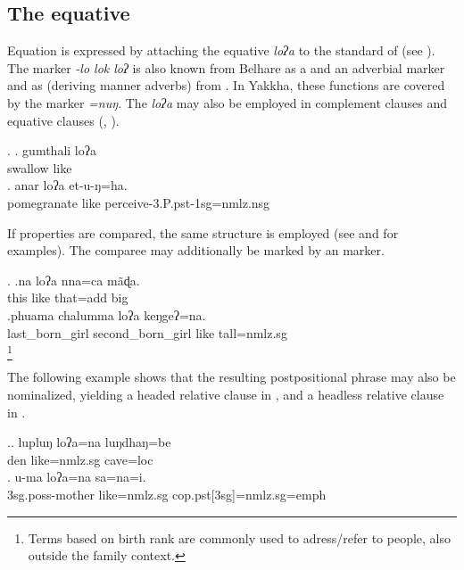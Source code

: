 \subsection{The equative}\label{sec-equ}

Equation is expressed by attaching the equative  \emph{loʔa}  to the standard of  (see \Next). The marker \emph{-lo \ti lok \ti loʔ} is also known from Belhare as a  and an adverbial  marker \citep{Bickel1993Belhare} and as  (deriving manner adverbs) from   \citep[299]{Doornenbal2009A-grammar}. In Yakkha, these functions are covered by the  marker \emph{=nuŋ}. The  \emph{loʔa}  may also be employed in complement clauses and equative clauses (, ). 

 \ex. \ag. gumthali loʔa\\ 
 swallow like\\
  \bg. anar loʔa et-u-ŋ=ha.\\ 
  pomegranate like perceive-{\sc 3.P.pst-1sg=nmlz.nsg}\\
   
  
If properties are compared, the same structure is employed (see \Next and  for examples). The comparee may additionally be marked by an  marker.
  
  \ex. \ag.na loʔa nna=ca mãɖa.\\
this like that{\sc =add} big\\
  \bg.phuama chalumma loʔa keŋgeʔ=na.\\
  last\_born\_girl  second\_born\_girl  like tall{\sc =nmlz.sg}\\
  \footnote{Terms based on birth rank are commonly used to adress/refer to people, also outside the family context.}

 The following example shows that the resulting postpositional phrase may also be nominalized, yielding a headed relative clause in \Next[a], and a headless relative clause in \Next[b]. 
 
  \ex.\ag. lupluŋ loʔa=na       luŋdhaŋ=be\\
  den like{\sc =nmlz.sg} cave{\sc =loc}\\
   
\bg.  u-ma              loʔa=na        sa=na=i.\\
{\sc 3sg.poss-}mother like{\sc =nmlz.sg} {\sc cop.pst[3sg]=nmlz.sg=emph}\\
 

